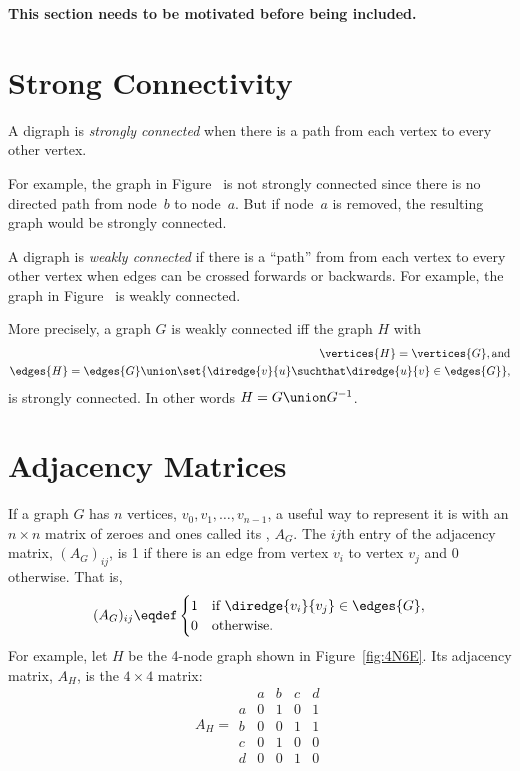 \begin{editingnotes}

\textbf{This section needs to be motivated before being included.}

\section{Strong Connectivity}

\begin{definition}
A digraph is \emph{strongly connected}%
when there is a path from each vertex to every other vertex.
\end{definition}

For example, the graph in Figure~%
is not strongly connected since there is no directed path from
node~$b$ to node~$a$.  But if node~$a$ is removed, the resulting graph
would be strongly connected.

A digraph is \emph{weakly connected}%
\iffalse or, more simply,
\emph{connected})\fi if there is a ``path'' from from each vertex to
every other vertex when edges can be crossed forwards or backwards.
For example, the graph in Figure~%
is weakly connected.

More precisely, a graph $G$ is weakly connected iff the graph $H$ with
\begin{align*}
\vertices{H} = \vertices{G}, \text{and}\\
\edges{H} = \edges{G} \union \set{\diredge{v}{u} \suchthat \diredge{u}{v} \in \edges{G}},
\end{align*}
is strongly connected.  In other words $H = G \union G^{-1}$.
\end{editingnotes}


\section{Adjacency Matrices}\label{sec:adjacency-matrix-digraph}
If a graph $G$ has $n$ vertices, $v_0,v_1,\dots, v_{n-1}$, a useful
way to represent it is with an $n \times n$ matrix of zeroes and ones
called its , $A_G$.  The $ij$th
entry of the adjacency matrix,  $(A_G)_{ij}$, is 1 if there is an edge
from vertex $v_i$ to vertex $v_j$ and 0 otherwise.  That is,
\[
(A_G)_{ij} \eqdef \begin{cases} 1 & \text{if } \diredge{v_i}{v_j} \in
  \edges{G},\\
0 & \text{otherwise}.
\end{cases}
\]
For example, let $H$ be the 4-node graph shown in
Figure~\ref{fig:4N6E}.  Its adjacency matrix, $A_H$, is the $4 \times
4$ matrix:
\[
A_H =\begin{array}{c|cccc|}
  &  a & b & c & d \\ \hline
a &  0 & 1 & 0 & 1 \\
b &  0 & 0 & 1 & 1 \\
c &  0 & 1 & 0 & 0 \\
d &  0 & 0 & 1 & 0
\end{array}
\]

